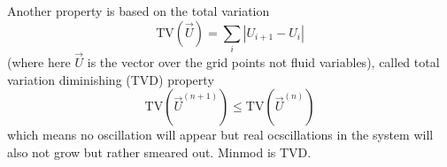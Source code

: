 Another property is based on the total variation
\begin{equation}
    \text{TV}(\vec{U}) = \sum_i \left| U_{i+1} - U_i \right|
\end{equation}
(where here $\vec{U}$ is the vector over the grid points not fluid variables),
called total variation diminishing (TVD) property
\begin{equation}
    \text{TV}(\vec{U}^{(n+1)}) \leq \text{TV}(\vec{U}^{(n)})
\end{equation}
which means no oscillation will appear but real ocscillations
in the system will also not grow but rather smeared out.
Minmod is TVD.

\pagebreak